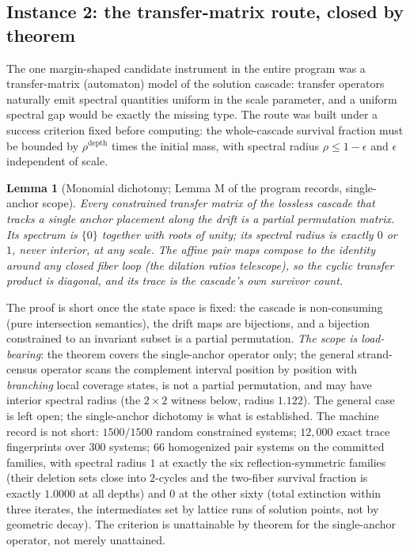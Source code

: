 \documentclass[11pt,a4paper]{article}
\numberwithin{equation}{section}
\theoremstyle{plain}
\newtheorem{lemma}[theorem]{Lemma}
\theoremstyle{definition}
\theoremstyle{remark}
\begin{document}
\subsection{Instance 2: the transfer-matrix route, closed by theorem}
\label{sec:tm-transfer}

The one margin-shaped candidate instrument in the entire program was a
transfer-matrix (automaton) model of the solution cascade: transfer
operators naturally emit spectral quantities uniform in the scale
parameter, and a uniform spectral gap would be exactly the missing type.
The route was built under a success criterion fixed before computing:
the whole-cascade survival fraction must be bounded by
$\rho^{\mathrm{depth}}$ times the initial mass, with spectral radius
$\rho\le 1-\epsilon$ and $\epsilon$ independent of scale.

\begin{lemma}[Monomial dichotomy; Lemma M of the program records, single-anchor scope]
\label{lem:monomial}
Every constrained transfer matrix of the lossless cascade \emph{that
tracks a single anchor placement along the drift} is a partial
permutation matrix. Its spectrum is $\{0\}$ together with roots of unity;
its spectral radius is exactly $0$ or $1$, never interior, at any scale.
The affine pair maps compose to the identity
around any closed fiber loop (the dilation ratios telescope), so the
cyclic transfer product is diagonal, and its trace is the cascade's own
survivor count.
\end{lemma}

The proof is short once the state space is fixed: the cascade is
non-consuming (pure intersection semantics), the drift maps are
bijections, and a bijection constrained to an invariant subset is a
partial permutation. \emph{The scope is load-bearing}: the theorem
covers the single-anchor operator only; the general strand-census
operator scans the complement interval position by position with
\emph{branching} local coverage states, is not a partial permutation,
and may have interior spectral radius (the $2\times2$ witness below,
radius $1.122$). The general case is left open; the single-anchor
dichotomy is what is established. The machine record is not short:
$1500/1500$ random constrained systems; $12{,}000$ exact trace
fingerprints over $300$ systems; $66$ homogenized pair systems on the
committed families, with
spectral radius $1$ at exactly the six reflection-symmetric families
(their deletion sets close into $2$-cycles and the two-fiber survival
fraction is exactly $1.0000$ at all depths) and $0$ at the other sixty
(total extinction within three iterates, the intermediates set by lattice
runs of solution points, not by geometric decay). The criterion is
unattainable by theorem for the single-anchor operator, not merely
unattained.
\end{document}
